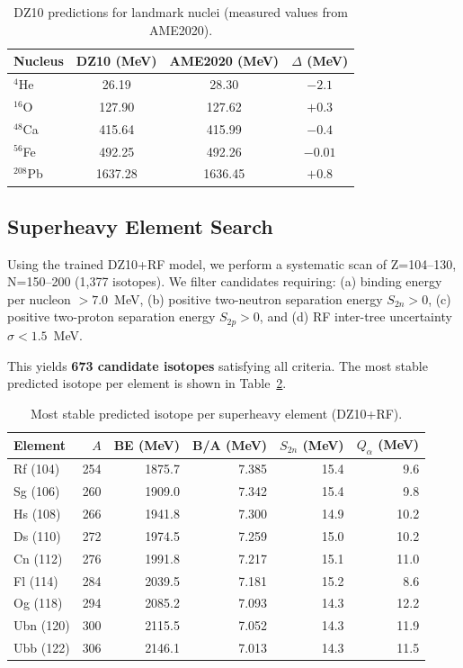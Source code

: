 \documentclass[letterpaper,11pt]{article}
\begin{document}
\begin{table}[h]
\centering
\caption{DZ10 predictions for landmark nuclei (measured values from AME2020).}
\label{tab:landmarks}
\begin{tabular}{lccc}
\toprule
Nucleus & DZ10 (MeV) & AME2020 (MeV) & $\Delta$ (MeV) \\
\midrule
$^{4}$He & 26.19 & 28.30 & $-2.1$ \\
$^{16}$O & 127.90 & 127.62 & $+0.3$ \\
$^{48}$Ca & 415.64 & 415.99 & $-0.4$ \\
$^{56}$Fe & 492.25 & 492.26 & $-0.01$ \\
$^{208}$Pb & 1637.28 & 1636.45 & $+0.8$ \\
\bottomrule
\end{tabular}
\end{table}

\subsection{Superheavy Element Search}

Using the trained DZ10+RF model, we perform a systematic scan of Z=104--130,
N=150--200 (1,377 isotopes). We filter candidates requiring: (a) binding energy
per nucleon $> 7.0$~MeV, (b) positive two-neutron separation energy $S_{2n} > 0$,
(c) positive two-proton separation energy $S_{2p} > 0$, and (d) RF
inter-tree uncertainty $\sigma < 1.5$~MeV.

This yields \textbf{673 candidate isotopes} satisfying all criteria. The most
stable predicted isotope per element is shown in Table~\ref{tab:superheavy}.

\begin{table}[h]
\centering
\caption{Most stable predicted isotope per superheavy element (DZ10+RF).}
\label{tab:superheavy}
\begin{tabular}{lrrrrr}
\toprule
Element & $A$ & BE (MeV) & B/A (MeV) & $S_{2n}$ (MeV) & $Q_\alpha$ (MeV) \\
\midrule
Rf (104) & 254 & 1875.7 & 7.385 & 15.4 & 9.6 \\
Sg (106) & 260 & 1909.0 & 7.342 & 15.4 & 9.8 \\
Hs (108) & 266 & 1941.8 & 7.300 & 14.9 & 10.2 \\
Ds (110) & 272 & 1974.5 & 7.259 & 15.0 & 10.2 \\
Cn (112) & 276 & 1991.8 & 7.217 & 15.1 & 11.0 \\
Fl (114) & 284 & 2039.5 & 7.181 & 15.2 & 8.6 \\
Og (118) & 294 & 2085.2 & 7.093 & 14.3 & 12.2 \\
Ubn (120) & 300 & 2115.5 & 7.052 & 14.3 & 11.9 \\
Ubb (122) & 306 & 2146.1 & 7.013 & 14.3 & 11.5 \\
\bottomrule
\end{tabular}
\end{table}
\end{document}

